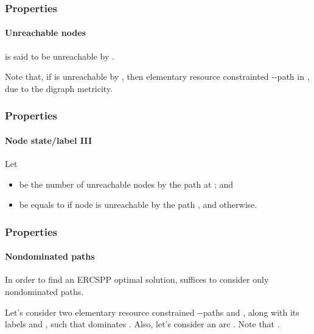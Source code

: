 \begin{frame}
  \frametitle{Properties}
  \framesubtitle{Unreachable nodes}
  \begin{definition}
   is said to be unreachable by  .
  \end{definition}
  Note that, if  is unreachable by , then \blue{$\nexists$} elementary resource constrainted --path in , due to the digraph metricity.
\end{frame}

\begin{frame}
  \frametitle{Properties}
  \framesubtitle{Node state/label III}
  Let
  \begin{itemize}
    \item {} be the number of unreachable nodes by the path  at ; and 
    \item {} be equals to  if node  is unreachable by the path , and  otherwise.
  \end{itemize}
\end{frame}

\begin{frame}
  \frametitle{Properties}
  \framesubtitle{Nondominated paths}
  \begin{claim}
    In order to find an ERCSPP optimal solution, suffices to consider only nondominated paths.
  \end{claim}
  \begin{claimproof}
    Let's consider two elementary resource constrained --paths  and , along with its labels  and , such that  dominates .
    Also, let's consider an arc  .
    Note that  .
  \end{claimproof}
\end{frame}
